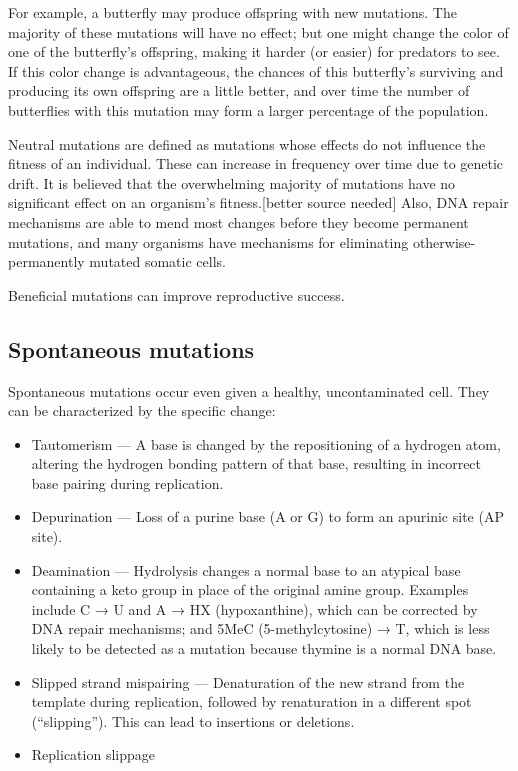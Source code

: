 For example, a butterfly may produce offspring with new mutations. The majority of these mutations will have no effect; but one might change the color of one of the butterfly's offspring, making it harder (or easier) for predators to see. If this color change is advantageous, the chances of this butterfly's surviving and producing its own offspring are a little better, and over time the number of butterflies with this mutation may form a larger percentage of the population.

Neutral mutations are defined as mutations whose effects do not influence the fitness of an individual. These can increase in frequency over time due to genetic drift. It is believed that the overwhelming majority of mutations have no significant effect on an organism's fitness.{[}better source needed{]} Also, DNA repair mechanisms are able to mend most changes before they become permanent mutations, and many organisms have mechanisms for eliminating otherwise-permanently mutated somatic cells.

Beneficial mutations can improve reproductive success.

\hypertarget{spontaneous-mutations}{%
\subsection{Spontaneous mutations}\label{spontaneous-mutations}}

Spontaneous mutations occur even given a healthy, uncontaminated cell. They can be characterized by the specific change:

\begin{itemize}
\tightlist
\item
  Tautomerism --- A base is changed by the repositioning of a hydrogen atom, altering the hydrogen bonding pattern of that base, resulting in incorrect base pairing during replication.
\item
  Depurination --- Loss of a purine base (A or G) to form an apurinic site (AP site).
\item
  Deamination --- Hydrolysis changes a normal base to an atypical base containing a keto group in place of the original amine group. Examples include C → U and A → HX (hypoxanthine), which can be corrected by DNA repair mechanisms; and 5MeC (5-methylcytosine) → T, which is less likely to be detected as a mutation because thymine is a normal DNA base.
\item
  Slipped strand mispairing --- Denaturation of the new strand from the template during replication, followed by renaturation in a different spot (``slipping''). This can lead to insertions or deletions.
\item
  Replication slippage
\end{itemize}

